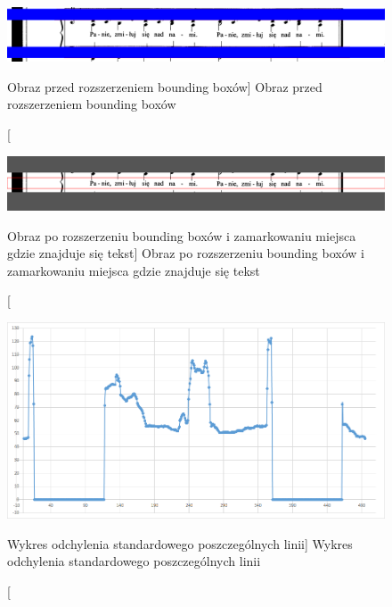 \documentclass[a4paper,12pt]{article}
\begin{document}
			    \begin{figure}[!ht]  
			        \begin{center}
				        \includegraphics[width=15cm, frame] {image//exampleImage//005_a.png} 
			        \end{center}
			        \caption
    			        [Obraz przed rozszerzeniem bounding boxów]  
    			        {Obraz przed rozszerzeniem bounding boxów}  
		        \end{figure} 
		
		        \begin{figure}[!ht]  
			        \begin{center}
				        \includegraphics[width=15cm, frame] {image//exampleImage//005_b.png} 
			        \end{center}
			        \caption
    			        [Obraz po rozszerzeniu bounding boxów i zamarkowaniu miejsca gdzie znajduje się tekst]  
    			        {Obraz po rozszerzeniu bounding boxów i zamarkowaniu miejsca gdzie znajduje się tekst}  
		        \end{figure} 
		    
		        \begin{figure}[!ht]  
			        \begin{center}
				        \includegraphics[width=12cm, frame] {image//practicalPart//stdDevDetectText.png} 
			        \end{center}
			        \caption
        			    [Wykres odchylenia standardowego poszczególnych linii]  
        			    {Wykres odchylenia standardowego poszczególnych linii}  
		        \end{figure}
		    
\end{document}
